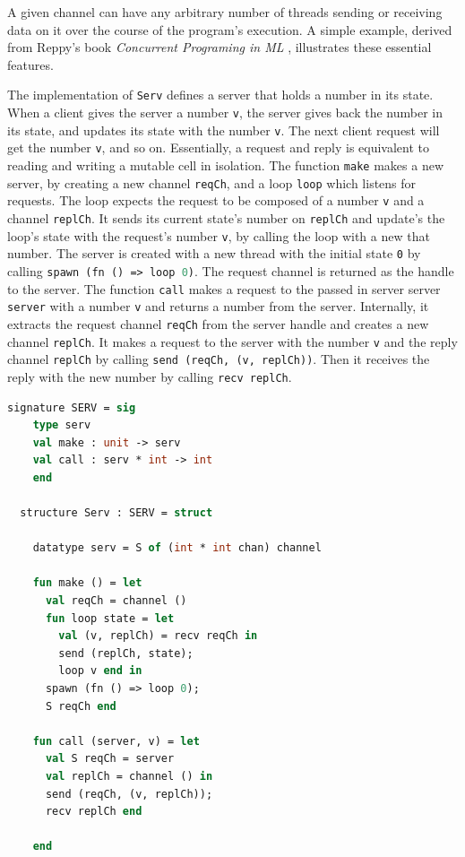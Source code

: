 \documentclass{article}
\begin{document}
A given channel can have any arbitrary number of threads sending or receiving data on it over
the course of the program's execution. A simple example, derived from Reppy's book
\textit{Concurrent Programing in ML} \cite{concurrent_ml}, illustrates these essential
features.

The implementation of \lstinline{Serv} defines a server that holds a number in its state.
When a client gives the server a number \lstinline{v}, the server gives back the number in
its state, and updates its state with the number \lstinline{v}.  The next client request will
get the number \lstinline{v}, and so on. Essentially, a request and reply is equivalent
to reading and writing a mutable cell in isolation. The function \lstinline{make} makes a new
server, by creating a new channel \lstinline{reqCh}, and a loop \lstinline{loop} which listens
for requests. The loop expects the request to be composed of a number \lstinline{v} and a
channel \lstinline{replCh}. It sends its current state's number on \lstinline{replCh} and
update's the loop's state with the request's number \lstinline{v}, by calling the loop with a
new that number. The server is created with a new thread with the initial state \lstinline{0}
by calling \lstinline[language=ML]{spawn (fn () => loop 0)}. The request channel is returned
as the handle to the server.  The function \lstinline{call} makes a request to the passed in
server server \lstinline{server} with a number \lstinline{v} and returns a number from the
server. Internally, it extracts the request channel \lstinline{reqCh} from the
server handle and creates a new channel \lstinline{replCh}. It makes a request to the server
with the number \lstinline{v} and the reply channel \lstinline{replCh} by calling
\lstinline{send (reqCh, (v, replCh))}. Then it receives the reply with the new number by
calling \lstinline{recv replCh}.


\begin{lstlisting}[language=ML, escapechar=\%]
  signature SERV = sig 
    type serv
    val make : unit -> serv
    val call : serv * int -> int
    end

  structure Serv : SERV = struct 

    datatype serv = S of (int * int chan) channel 

    fun make () = let 
      val reqCh = channel ()
      fun loop state = let
        val (v, replCh) = recv reqCh in 
        send (replCh, state);
        loop v end in
      spawn (fn () => loop 0);
      S reqCh end 

    fun call (server, v) = let 
      val S reqCh = server
      val replCh = channel () in 
      send (reqCh, (v, replCh));
      recv replCh end

    end
  \end{lstlisting}
\end{document}
